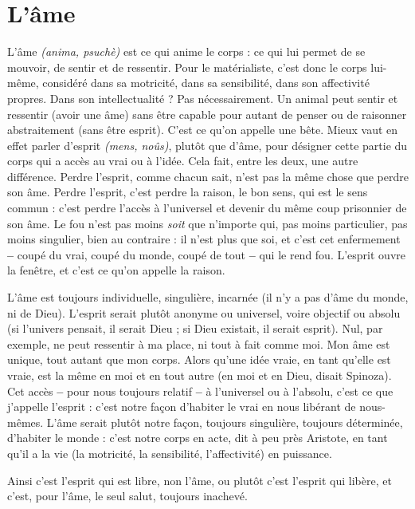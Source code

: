 
\section{L'âme}
L'âme {\it (anima, psuchè)} est ce qui anime le corps : ce qui lui permet de se
mouvoir, de sentir et de ressentir. Pour le matérialiste, c’est donc le
corps lui-même, considéré dans sa motricité, dans sa sensibilité, dans son affectivité
propres. Dans son intellectualité ? Pas nécessairement. Un animal peut
sentir et ressentir (avoir une âme) sans être capable pour autant de penser ou de
raisonner abstraitement (sans être esprit). C’est ce qu’on appelle une bête.
Mieux vaut en effet parler d’esprit {\it (mens, noûs)}, plutôt que d’âme, pour désigner
cette partie du corps qui a accès au vrai ou à l’idée. Cela fait, entre les
deux, une autre différence. Perdre l'esprit, comme chacun sait, n’est pas la
même chose que perdre son âme. Perdre l'esprit, c’est perdre la raison, le bon
sens, qui est le sens commun : c’est perdre l’accès à l’universel et devenir du
même coup prisonnier de son âme. Le fou n’est pas moins {\it soit} que n'importe
qui, pas moins particulier, pas moins singulier, bien au contraire : il n’est plus
que soi, et c’est cet enfermement {\bf --} coupé du vrai, coupé du monde, coupé de
tout {\bf --} qui le rend fou. L'esprit ouvre la fenêtre, et c’est ce qu’on appelle la
raison.

L'âme est toujours individuelle, singulière, incarnée (il n’y a pas d’âme du
monde, ni de Dieu). L’esprit serait plutôt anonyme ou universel, voire objectif
ou absolu (si l’univers pensait, il serait Dieu ; si Dieu existait, il serait esprit).
Nul, par exemple, ne peut ressentir à ma place, ni tout à fait comme moi. Mon
âme est unique, tout autant que mon corps. Alors qu’une idée vraie, en tant
qu’elle est vraie, est la même en moi et en tout autre (en moi et en Dieu, disait
Spinoza). Cet accès {\bf --} pour nous toujours relatif {\bf --} à l’universel ou à l'absolu,
c'est ce que j'appelle l'esprit : c’est notre façon d’habiter le vrai en nous libérant
de nous-mêmes. L’âme serait plutôt notre façon, toujours singulière, toujours
déterminée, d’habiter le monde : c’est notre corps en acte, dit à peu près Aristote,
en tant qu'il a la vie (la motricité, la sensibilité, l’affectivité) en puissance.

Ainsi c’est l'esprit qui est libre, non l’âme, ou plutôt c’est l'esprit qui libère,
et c’est, pour l’âme, le seul salut, toujours inachevé.

